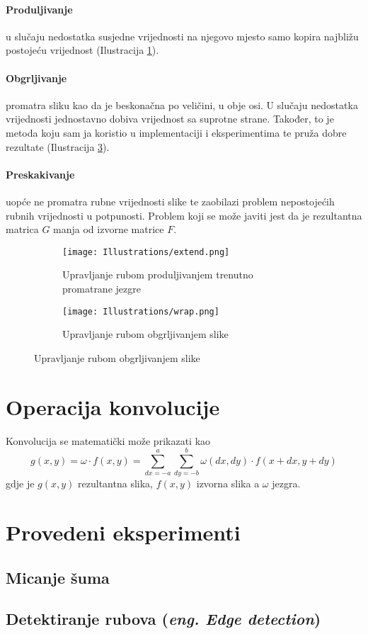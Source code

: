 \paragraph{Produljivanje}
u slučaju nedostatka susjedne vrijednosti na njegovo mjesto samo kopira najbližu postojeću vrijednost (Ilustracija \ref{fig:extend_edge}).

\paragraph{Obgrljivanje}
promatra sliku kao da je beskonačna po veličini, u obje osi.
U slučaju nedostatka vrijednosti  jednostavno dobiva vrijednost sa suprotne strane.
Također, to je metoda koju sam ja koristio u implementaciji i eksperimentima te pruža dobre rezultate (Ilustracija \ref{fig:wrap_edge}).

\paragraph{Preskakivanje}
uopće ne promatra rubne vrijednosti slike te zaobilazi problem nepostojećih rubnih vrijednosti u potpunosti.
Problem koji se može javiti jest da je rezultantna matrica $G$ manja od izvorne matrice $F$.

\begin{figure}
	\caption{Grafički prikaz dva različita načina upravljanja rubnim vrijednostima s označenim rubom slike i trenutnom pozicijom jezgre}
	\begin{subfigure}[t]{0.48\textwidth}
		\texttt{[image: Illustrations/extend.png]}
		\caption{Upravljanje rubom produljivanjem trenutno promatrane jezgre}
		\label{fig:extend_edge}
	\end{subfigure}
	\begin{subfigure}[t]{0.48\textwidth}
		\texttt{[image: Illustrations/wrap.png]}
		\caption{Upravljanje rubom obgrljivanjem slike}
		\label{fig:wrap_edge}
	\end{subfigure}
\end{figure}

\section{Operacija konvolucije}
Konvolucija se matematički može prikazati kao
$$g(x, y) = \omega \cdot f(x,y) = \sum_{dx=-a}^{a} \sum_{dy=-b}^{b} \omega(dx, dy)\cdot f(x + dx, y + dy)$$
gdje je $g(x,y)$ rezultantna slika, $f(x, y)$ izvorna slika a $\omega$ jezgra.

\section{Provedeni eksperimenti}

\subsection{Micanje šuma}


\subsection{Detektiranje rubova (\emph{eng. Edge detection})}

